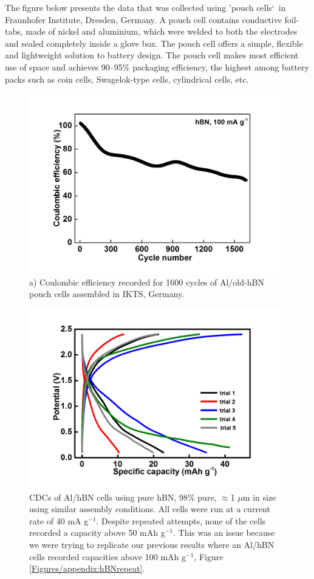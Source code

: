 The figure below presents the data that was collected using \rq pouch cells\lq\ in Fraunhofer Institute, Dresden, Germany. A pouch cell contains conductive foil-tabs, made of nickel and aluminium, which were welded to both the electrodes and sealed completely inside a glove box. The pouch cell offers a simple, flexible and lightweight solution to battery design. The pouch cell makes most efficient use of space and achieves 90–95\% packaging efficiency, the highest among battery packs such as coin cells, Swagelok-type cells, cylindrical cells, etc.
\begin{figure}[tbh!]
\centering
\includegraphics[width=\textwidth]{Figures/appendix/pouchCE}
\caption{a) Coulombic efficiency recorded for 1600 cycles of Al/old-hBN pouch cells assembled in IKTS, Germany.}
\label{Figures/appendix:pouchCE}
\end{figure}

\begin{figure}[tbh!]
\centering
\includegraphics[width=\textwidth]{Figures/appendix/hBNmultiattempts}
\caption{CDCs of Al/hBN cells using pure hBN, 98\% pure, $\approx$1 $\mu$m in size using similar assembly conditions. All cells were run at a current rate of 40 mA g$^{-1}$. Despite repeated attempts, none of the cells recorded a capacity above 50 mAh g$^{-1}$. This was an issue because we were trying to replicate our previous results where an Al/hBN cells recorded capacities above 100 mAh g$^{-1}$, Figure \ref{Figures/appendix:hBNrepeat}.}
\label{Figures/appendix:hBNmultiattempts}
\end{figure}

